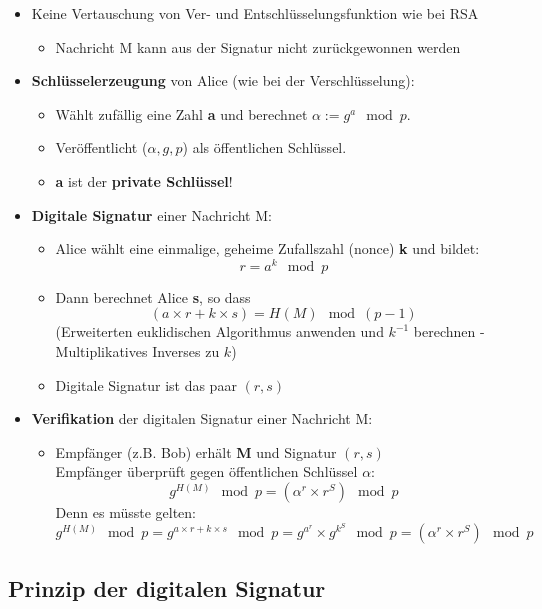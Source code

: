 \documentclass[openany]{book}
\begin{document}
\begin{itemize}
    \item Keine Vertauschung von Ver- und Entschlüsselungsfunktion wie bei RSA
    \begin{itemize}
        \item Nachricht M kann aus der Signatur nicht zurückgewonnen werden
    \end{itemize}
    \item \textbf{Schlüsselerzeugung} von Alice (wie bei der Verschlüsselung):
    \begin{itemize}
        \item Wählt zufällig eine Zahl \textbf{a} und berechnet $\alpha := g^a\mod p$.
        \item Veröffentlicht ($\alpha , g,p$) als öffentlichen Schlüssel.
        \item \textbf{a} ist der \textbf{private Schlüssel}! \\
    \end{itemize}
    \item \textbf{Digitale Signatur} einer Nachricht M:
    \begin{itemize}
        \item Alice wählt eine einmalige, geheime Zufallszahl (nonce) \textbf{k} und bildet: $$r=a^k\mod p$$
        \item Dann berechnet Alice \textbf{s}, so dass $$(a\times r+k\times s)=H(M)\mod (p-1)$$ (Erweiterten euklidischen Algorithmus anwenden und $k^{-1}$ berechnen - Multiplikatives Inverses zu $k$)
        \item Digitale Signatur ist das paar $(r,s)$
    \end{itemize}
    \item \textbf{Verifikation} der digitalen Signatur einer Nachricht M:
    \begin{itemize}
        \item Empfänger (z.B. Bob) erhält \textbf{M} und Signatur $(r,s)$ \\ Empfänger überprüft gegen öffentlichen Schlüssel $\alpha$: $$g^{H(M)}\mod p=(\alpha^r \times r^S)\mod p$$ Denn es müsste gelten: $$g^{H(M)}\mod p=g^{a\times r+k\times s}\mod p=g^{a^r}\times g^{k^S}\mod p=(\alpha^r\times r^S)\mod p$$
    \end{itemize}
\end{itemize}

\subsection{Prinzip der digitalen Signatur}
\end{document}
